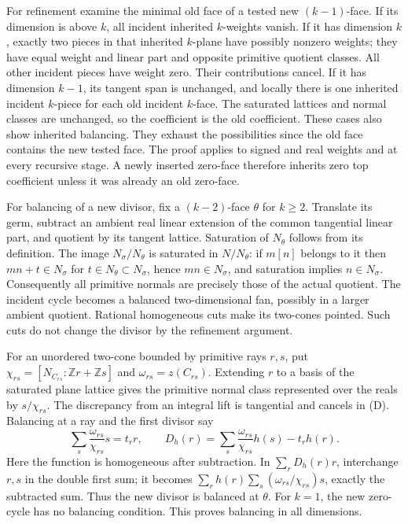 \documentclass[
  11pt,
]{article}
\begin{document}
For refinement examine the minimal old face of a tested new
\((k-1)\)-face. If its dimension is above \(k\), all incident inherited
\(k\)-weights vanish. If it has dimension \(k\), exactly two pieces in
that inherited \(k\)-plane have possibly nonzero weights; they have
equal weight and linear part and opposite primitive quotient classes.
All other incident pieces have weight zero. Their contributions cancel.
If it has dimension \(k-1\), its tangent span is unchanged, and locally
there is one inherited incident \(k\)-piece for each old incident
\(k\)-face. The saturated lattices and normal classes are unchanged, so
the coefficient is the old coefficient. These cases also show inherited
balancing. They exhaust the possibilities since the old face contains
the new tested face. The proof applies to signed and real weights and at
every recursive stage. A newly inserted zero-face therefore inherits
zero top coefficient unless it was already an old zero-face.

For balancing of a new divisor, fix a \((k-2)\)-face \(\theta\) for
\(k\geq2\). Translate its germ, subtract an ambient real linear
extension of the common tangential linear part, and quotient by its
tangent lattice. Saturation of \(N_\theta\) follows from its definition.
The image \(N_\sigma/N_\theta\) is saturated in \(N/N_\theta\): if
\(m[n]\) belongs to it then \(mn+t\in N_\sigma\) for
\(t\in N_\theta\subset N_\sigma\), hence \(mn\in N_\sigma\), and
saturation implies \(n\in N_\sigma\). Consequently all primitive normals
are precisely those of the actual quotient. The incident cycle becomes a
balanced two-dimensional fan, possibly in a larger ambient quotient.
Rational homogeneous cuts make its two-cones pointed. Such cuts do not
change the divisor by the refinement argument.

For an unordered two-cone bounded by primitive rays \(r,s\), put
\(\chi_{rs}=[N_{C_{rs}}:\mathbb{Z}r+\mathbb{Z}s]\) and
\(\omega_{rs}=z(C_{rs})\). Extending \(r\) to a basis of the saturated
plane lattice gives the primitive normal class represented over the
reals by \(s/\chi_{rs}\). The discrepancy from an integral lift is
tangential and cancels in (D). Balancing at a ray and the first divisor
say \[
 \sum_s\frac{\omega_{rs}}{\chi_{rs}}s=t_rr,
 \qquad D_h(r)=\sum_s\frac{\omega_{rs}}{\chi_{rs}}h(s)-t_rh(r).
 \tag{F}
\] Here the function is homogeneous after subtraction. In
\(\sum_rD_h(r)r\), interchange \(r,s\) in the double first sum; it
becomes \(\sum_r h(r)\sum_s(\omega_{rs}/\chi_{rs})s\), exactly the
subtracted sum. Thus the new divisor is balanced at \(\theta\). For
\(k=1\), the new zero-cycle has no balancing condition. This proves
balancing in all dimensions.
\end{document}
